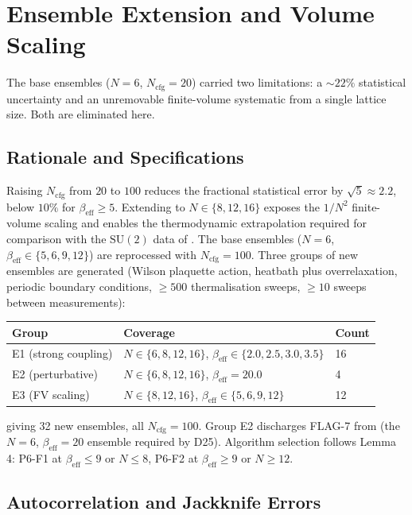 \documentclass[11pt,a4paper]{article}
\theoremstyle{plain}
\theoremstyle{definition}
\theoremstyle{remark}
\newcommand{\SU}{\mathrm{SU}}
\newcommand{\be}{\beta_{\mathrm{eff}}}
\newcommand{\Ncfg}{N_{\mathrm{cfg}}}
\begin{document}
\section{Ensemble Extension and Volume Scaling}
\label{sec:ensembles}

The base ensembles ($N=6$, $\Ncfg=20$) carried two limitations: a $\sim22\%$
statistical uncertainty and an unremovable finite-volume systematic from a
single lattice size. Both are eliminated here.

\subsection{Rationale and Specifications}
\label{ssec:ensemblespec}

Raising $\Ncfg$ from $20$ to $100$ reduces the fractional statistical
error by $\sqrt5\approx2.2$, below $10\%$ for $\be\ge5$. Extending to
$N\in\{8,12,16\}$ exposes the $1/N^2$ finite-volume scaling and enables
the thermodynamic extrapolation required for comparison with the
$\SU(2)$ data of \cite{CM}.
The base ensembles ($N=6$, $\be\in\{5,6,9,12\}$) are reprocessed with
$\Ncfg=100$. Three groups of new ensembles are generated (Wilson plaquette
action, heatbath plus overrelaxation, periodic boundary conditions,
$\ge500$ thermalisation sweeps, $\ge10$ sweeps between measurements):

\begin{center}
\renewcommand{\arraystretch}{1.15}
\begin{tabular}{lll}
\toprule
Group & Coverage & Count\\
\midrule
E1 (strong coupling) & $N\in\{6,8,12,16\}$, $\be\in\{2.0,2.5,3.0,3.5\}$ & 16\\
E2 (perturbative)    & $N\in\{6,8,12,16\}$, $\be=20.0$ & 4\\
E3 (FV scaling)      & $N\in\{8,12,16\}$, $\be\in\{5,6,9,12\}$ & 12\\
\bottomrule
\end{tabular}
\end{center}

\noindent
giving 32 new ensembles, all $\Ncfg=100$. Group E2 discharges FLAG-7 from
 (the $N=6$, $\be=20$ ensemble required by D25).
Algorithm selection follows Lemma 4: P6-F1 at $\be\le9$ or $N\le8$,
P6-F2 at $\be\ge9$ or $N\ge12$.

\subsection{Autocorrelation and Jackknife Errors}
\label{ssec:jackknife}
\end{document}
